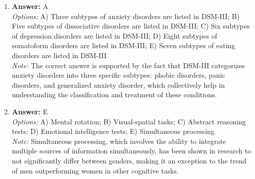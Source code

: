 \documentclass[12pt]{article}
\begin{document}
\begin{enumerate}[label=\arabic*.]
\item \textbf{Answer:} A
\\ \textit{Options:} A) Three subtypes of anxiety disorders are listed in DSM-III; B) Five subtypes of dissociative disorders are listed in DSM-III; C) Six subtypes of depression disorders are listed in DSM-III; D) Eight subtypes of somatoform disorders are listed in DSM-III; E) Seven subtypes of eating disorders are listed in DSM-III
\\ \textit{Note:} The correct answer is supported by the fact that DSM-III categorizes anxiety disorders into three specific subtypes: phobic disorders, panic disorders, and generalized anxiety disorder, which collectively help in understanding the classification and treatment of these conditions.
\item \textbf{Answer:} E
\\ \textit{Options:} A) Mental rotation; B) Visual-spatial tasks; C) Abstract reasoning tests; D) Emotional intelligence tests; E) Simultaneous processing
\\ \textit{Note:} Simultaneous processing, which involves the ability to integrate multiple sources of information simultaneously, has been shown in research to not significantly differ between genders, making it an exception to the trend of men outperforming women in other cognitive tasks.
\end{enumerate}
\end{document}
